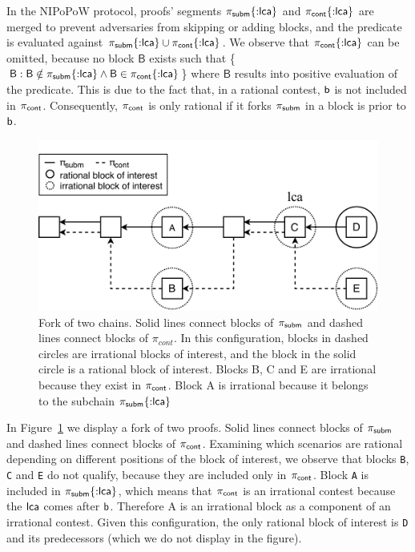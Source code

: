 \newcommand{\block}{\mathsf{B}}

In the NIPoPoW protocol, proofs' segments $\mathsf{\pi_{subm}}\{{{:}}\mathsf{lca}\}$ and $\mathsf{\pi_{cont}}\{{:}\mathsf{lca}\}$
are merged to prevent adversaries from skipping or adding blocks, and the
predicate is evaluated against $\mathsf{\pi_{subm}}\{{:}\mathsf{lca}\} \cup \mathsf{\pi_{cont}}\{{:}\mathsf{lca}\}$. We observe
that $\mathsf{\pi_{cont}}\{{:}\mathsf{lca}\}$ can be omitted, because no block $\block$ exists such that
\{$\block : \block \notin \pis\{{:}\lca\} \land \block \in \pic\{{:}\lca\}$\} where
$\block$ results into positive evaluation of the predicate. This is due to the
fact that, in a rational contest, $\mathsf{b}$ is not included in $\mathsf{\pi_{cont}}$.
Consequently, $\mathsf{\pi_{cont}}$ is only rational if it forks $\mathsf{\pi_{subm}}$ in a block is prior
to $\mathsf{b}$.

\renewcommand{\block}{}

\begin{figure}[h]
    \begin{center}
        \includegraphics[width=1\columnwidth]{figures/boi-position.pdf}
    \end{center}
    \caption{Fork of two chains. Solid lines connect blocks of $\mathsf{\pi_{subm}}$
    and dashed lines connect blocks of $\pi_{cont}$. In this configuration,
    blocks in dashed circles are irrational blocks of interest, and the block
    in the solid circle is a rational block of interest. Blocks B, C and E are
    irrational because they exist in $\mathsf{\pi_{cont}}$. Block A is irrational because it
    belongs to the subchain $\mathsf{\pi_{subm}}\{{:}\mathsf{lca}\}$}
    \label{fig:boi-position}
\end{figure}

In Figure~\ref{fig:boi-position} we display a fork of two proofs. Solid lines
connect blocks of $\mathsf{\pi_{subm}}$ and dashed lines connect blocks of $\mathsf{\pi_{cont}}$.  Examining
which scenarios are rational depending on different positions of the block of
interest, we observe that blocks \texttt{B}, \texttt{C} and \texttt{E} do not
qualify, because they are included only in $\mathsf{\pi_{cont}}$. Block \texttt{A} is included
in $\mathsf{\pi_{subm}}\{{:}\mathsf{lca}\}$, which means that $\mathsf{\pi_{cont}}$ is an irrational contest because
the $\mathsf{lca}$ comes after $\mathsf{b}$. Therefore A is an irrational block as a component
of an irrational contest. Given this configuration, the only rational block of
interest is \texttt{D} and its predecessors (which we do not display in the
figure).


